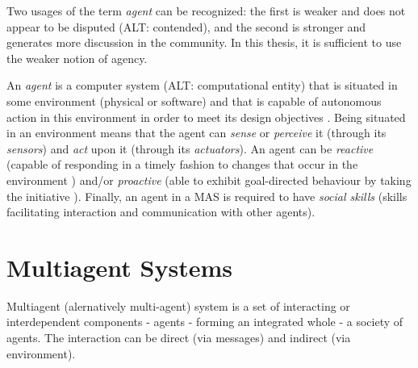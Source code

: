 Two usages of the term \textit{agent} can be recognized: the first is weaker and does not appear to be disputed (ALT: contended), and the second is stronger and generates more discussion in the community.
In this thesis, it is sufficient to use the weaker notion of agency.

An \textit{agent} is a computer system (ALT: computational entity) that is situated in some environment (physical or software) and that is capable of autonomous action in this environment in order to meet its design objectives \cite{Wooldridge02}.
Being situated in an environment means that the agent can \textit{sense} or \textit{perceive} it (through its \textit{sensors}) and \textit{act} upon it (through its \textit{actuators}).
An agent can be \textit{reactive} (capable of responding in a timely fashion to changes that occur in the environment \cite{Wooldridge95}) and/or \textit{proactive} (able to exhibit goal-directed behaviour by taking the initiative \cite{Woldridge95}).
Finally, an agent in a MAS is required to have \textit{social skills} (skills facilitating interaction and communication with other agents).

\section{Multiagent Systems}

Multiagent (alernatively multi-agent) system is a set of interacting or interdependent components - agents - forming an integrated whole - a society of agents.
The interaction can be direct (via messages) and indirect (via environment).